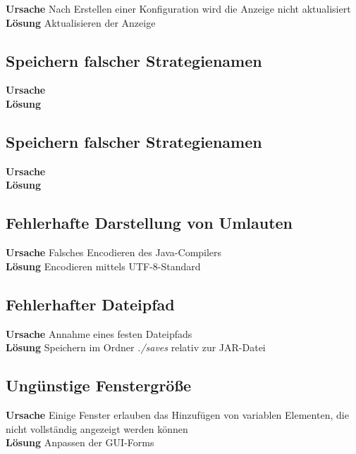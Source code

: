 \textbf{Ursache} Nach Erstellen einer Konfiguration wird die Anzeige nicht aktualisiert\\
\textbf{Lösung} Aktualisieren der Anzeige

\subsection{Speichern falscher Strategienamen}

\textbf{Ursache}\\
\textbf{Lösung}

\subsection{Speichern falscher Strategienamen}

\textbf{Ursache}\\
\textbf{Lösung}

\subsection{Fehlerhafte Darstellung von Umlauten}

\textbf{Ursache} Falsches Encodieren des Java-Compilers\\
\textbf{Lösung} Encodieren mittels UTF-8-Standard

\subsection{Fehlerhafter Dateipfad}

\textbf{Ursache} Annahme eines festen Dateipfads\\
\textbf{Lösung} Speichern im Ordner \emph{./saves} relativ zur JAR-Datei

\subsection{Ungünstige Fenstergröße}

\textbf{Ursache} Einige Fenster erlauben das Hinzufügen von variablen Elementen, die nicht vollständig angezeigt werden können\\
\textbf{Lösung} Anpassen der GUI-Forms


